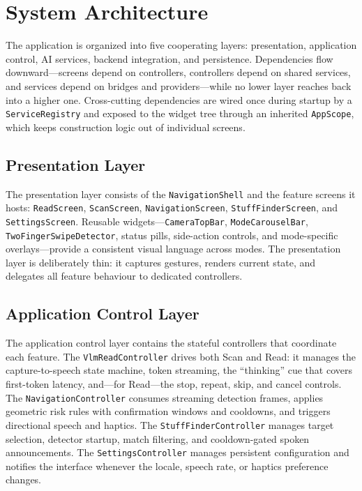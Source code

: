 \documentclass[a4paper]{report}
\begin{document}
\section{System Architecture}
The application is organized into five cooperating layers: presentation, application control, AI services, backend integration, and persistence. Dependencies flow downward---screens depend on controllers, controllers depend on shared services, and services depend on bridges and providers---while no lower layer reaches back into a higher one. Cross-cutting dependencies are wired once during startup by a \texttt{ServiceRegistry} and exposed to the widget tree through an inherited \texttt{AppScope}, which keeps construction logic out of individual screens.

\subsection{Presentation Layer}
The presentation layer consists of the \texttt{NavigationShell} and the feature screens it hosts: \texttt{ReadScreen}, \texttt{ScanScreen}, \texttt{NavigationScreen}, \texttt{StuffFinderScreen}, and \texttt{SettingsScreen}. Reusable widgets---\texttt{CameraTopBar}, \texttt{ModeCarouselBar}, \texttt{TwoFingerSwipeDetector}, status pills, side-action controls, and mode-specific overlays---provide a consistent visual language across modes. The presentation layer is deliberately thin: it captures gestures, renders current state, and delegates all feature behaviour to dedicated controllers.

\subsection{Application Control Layer}
The application control layer contains the stateful controllers that coordinate each feature. The \texttt{VlmReadController} drives both Scan and Read: it manages the capture-to-speech state machine, token streaming, the ``thinking'' cue that covers first-token latency, and---for Read---the stop, repeat, skip, and cancel controls. The \texttt{NavigationController} consumes streaming detection frames, applies geometric risk rules with confirmation windows and cooldowns, and triggers directional speech and haptics. The \texttt{StuffFinderController} manages target selection, detector startup, match filtering, and cooldown-gated spoken announcements. The \texttt{SettingsController} manages persistent configuration and notifies the interface whenever the locale, speech rate, or haptics preference changes.
\end{document}
